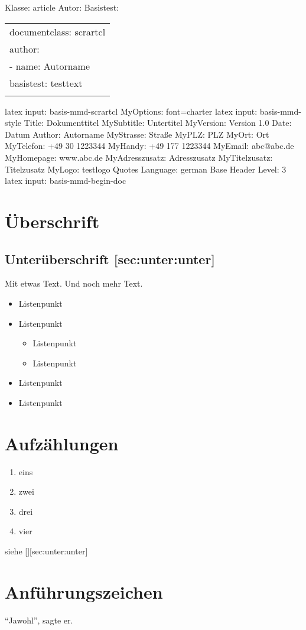 \documentclass[]{article}
\author{}
\date{}
\begin{document}
Klasse: article
Autor: 
Basistest: 

\begin{longtable}[c]{@{}l@{}}
\hline\noalign{\medskip}
documentclass: scrartcl
\\\noalign{\medskip}
author:
\\\noalign{\medskip}
- name: Autorname
\\\noalign{\medskip}
basistest: testtext
\\\noalign{\medskip}
\hline
\end{longtable}

latex input: basis-mmd-scrartcl MyOptions: font=charter latex input:
basis-mmd-style Title: Dokumenttitel MySubtitle: Untertitel MyVersion:
Version 1.0 Date: Datum Author: Autorname MyStrasse: Straße MyPLZ: PLZ
MyOrt: Ort MyTelefon: +49 30 1223344 MyHandy: +49 177 1223344 MyEmail:
abc@abc.de MyHomepage: www.abc.de MyAdresszusatz: Adresszusatz
MyTitelzusatz: Titelzusatz MyLogo: testlogo Quotes Language: german Base
Header Level: 3 latex input: basis-mmd-begin-doc

\section{Überschrift}

\subsection{Unterüberschrift {[}sec:unter:unter{]}}

Mit etwas Text. Und noch mehr Text.

\begin{itemize}
\itemsep1pt\parskip0pt
\item
  Listenpunkt
\item
  Listenpunkt

  \begin{itemize}
  \itemsep1pt\parskip0pt
  \item
    Listenpunkt
  \item
    Listenpunkt
  \end{itemize}
\item
  Listenpunkt
\item
  Listenpunkt
\end{itemize}

\section{Aufzählungen}

\begin{enumerate}
\def\labelenumi{\arabic{enumi}.}
\itemsep1pt\parskip0pt
\item
  eins
\item
  zwei
\item
  drei
\item
  vier
\end{enumerate}

siehe {[}{]}{[}sec:unter:unter{]}

\section{Anführungszeichen}

``Jawohl'', sagte er.
\end{document}
